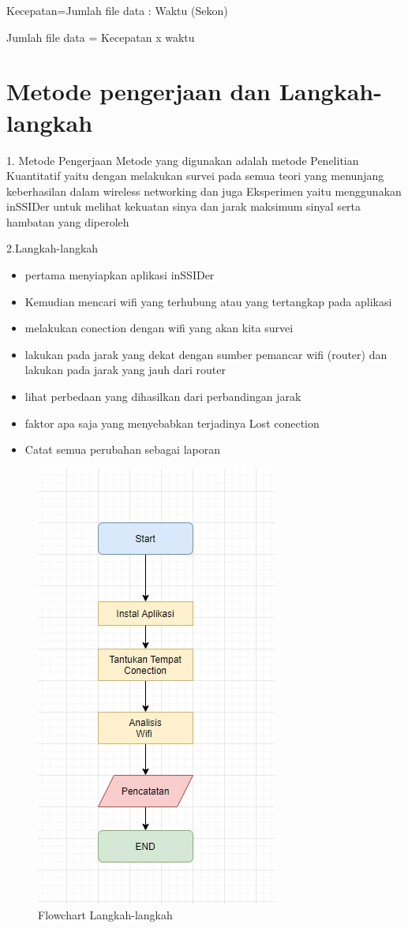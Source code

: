 \documentclass[conference]{IEEEtran}
\begin{document}
Kecepatan=Jumlah file data : Waktu (Sekon)

Jumlah file data = Kecepatan x waktu

\section{Metode pengerjaan dan Langkah-langkah}
1. Metode Pengerjaan
Metode yang digunakan adalah metode Penelitian Kuantitatif yaitu dengan melakukan survei pada semua teori yang menunjang keberhasilan dalam wireless networking dan juga Eksperimen yaitu menggunakan inSSIDer untuk melihat kekuatan sinya dan jarak maksimum sinyal serta hambatan yang diperoleh
\vspace{4pt}

2.Langkah-langkah 
\begin{itemize}
    \item pertama menyiapkan aplikasi inSSIDer
    \item Kemudian mencari wifi yang terhubung atau yang tertangkap pada aplikasi
    \item melakukan conection dengan wifi yang akan kita survei
    \item lakukan pada jarak yang dekat dengan sumber pemancar wifi (router) dan lakukan pada jarak yang jauh dari router
    \item lihat perbedaan yang dihasilkan dari perbandingan jarak
    \item faktor apa saja yang menyebabkan terjadinya Lost conection
    \item Catat semua perubahan sebagai laporan
\end{itemize}
\vspace{4cm}

\begin{figure}[h]
\centering
    \includegraphics[width=.4\textwidth]{image/001.jpg}
     \caption{Flowchart Langkah-langkah}
\end{figure}
\end{document}

